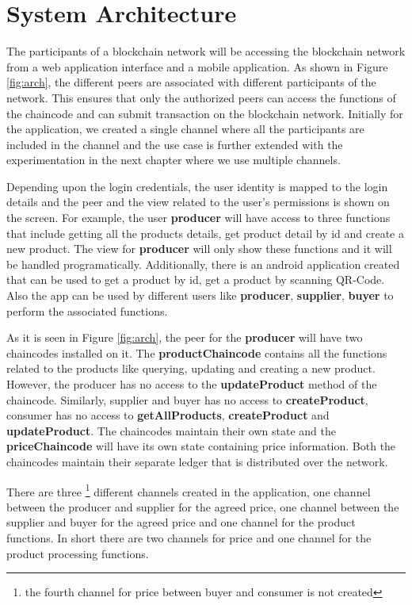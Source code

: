 \documentclass[
  a4paper,  %
  twoside,  %
  bibliography=totoc,
  headsepline,
  cleardoublepage=empty,
  parskip=half,
  draft=false
]{scrbook}
\begin{document}
\section{System Architecture}
The participants of a blockchain network will be accessing the blockchain network from a web application interface and a mobile application. As shown in Figure \ref{fig:arch}, the different peers are associated with different participants of the network. This ensures that only the authorized peers can access the functions of the chaincode and can submit transaction on the blockchain network. Initially for the application, we created a single channel where all the participants are included in the channel and the use case is further extended with the experimentation in the next chapter where we use multiple channels. 

Depending upon the login credentials, the user identity is mapped to the login details and the peer and the view related to the user's permissions is shown on the screen. For example, the user \textbf{producer} will have access to three functions that include getting all the products details, get product detail by id and create a new product. The view for \textbf{producer} will only show these functions and it will be handled programatically. Additionally, there is an android application created that can be used to get a product by id, get a product by scanning QR-Code. Also the app can be used by different users like \textbf{producer}, \textbf{supplier}, \textbf{buyer} to perform the associated functions.

As it is seen in Figure \ref{fig:arch}, the peer for the \textbf{producer} will have two chaincodes installed on it. The \textbf{productChaincode} contains all the functions related to the products like querying, updating and creating a new product. However, the producer has no access to the \textbf{updateProduct} method of the chaincode. Similarly, supplier and buyer has no access to \textbf{createProduct}, consumer has no access to \textbf{getAllProducts}, \textbf{createProduct} and \textbf{updateProduct}. The chaincodes maintain their own state and the \textbf{priceChaincode} will have its own state containing price information. Both the chaincodes maintain their separate ledger that is distributed over the network. 

There are three \footnote{the fourth channel for price between buyer and consumer is not created} different channels created in the application, one channel between the producer and supplier for the agreed price, one channel between the supplier and buyer for the agreed price and one channel for the product functions. In short there are two channels for price and one channel for the product processing functions.  
\end{document}
